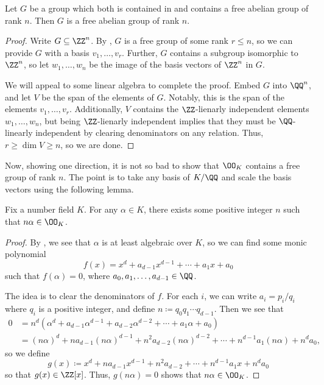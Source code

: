 \documentclass[../notes.tex]{subfiles}
\begin{document}
\begin{corollary} \label{cor:get-free-rank-n}
	Let $G$ be a group which both is contained in and contains a free abelian group of rank $n$. Then $G$ is a free abelian group of rank $n$.
\end{corollary}
\begin{proof}
	Write $G\subseteq\ZZ^n$. By , $G$ is a free group of some rank $r\le n$, so we can provide $G$ with a basis $v_1,\ldots,v_r$. Further, $G$ contains a subgroup isomorphic to $\ZZ^n$, so let $w_1,\ldots,w_n$ be the image of the basis vectors of $\ZZ^n$ in $G$.

	We will appeal to some linear algebra to complete the proof. Embed $G$ into $\QQ^n$, and let $V$ be the span of the elements of $G$. Notably, this is the span of the elements $v_1,\ldots,v_r$. Additionally, $V$ contains the $\ZZ$-lienarly independent elements $w_1,\ldots,w_n$, but being $\ZZ$-lienarly independent implies that they must be $\QQ$-linearly independent by clearing denominators on any relation. Thus, $r\ge\dim V\ge n$, so we are done.
\end{proof}
Now, showing one direction, it is not so bad to show that $\OO_K$ contains a free group of rank $n$. The point is to take any basis of $K/\QQ$ and scale the basis vectors using the following lemma.
\begin{lemma} \label{lem:clear-fraction-alg-int}
	Fix a number field $K$. For any $\alpha\in K$, there exists some positive integer $n$ such that $n\alpha\in\OO_K$.
\end{lemma}
\begin{proof}
	By , we see that $\alpha$ is at least algebraic over $K$, so we can find some monic polynomial
	\[f(x)=x^d+a_{d-1}x^{d-1}+\cdots+a_1x+a_0\]
	such that $f(\alpha)=0$, where $a_0,a_1,\ldots,a_{d-1}\in\QQ$.
	
	The idea is to clear the denominators of $f$. For each $i$, we can write $a_i=p_i/q_i$ where $q_i$ is a positive integer, and define $n\coloneqq  q_0q_1\cdots q_{d-1}$. Then we see that
	\begin{align*}
		0 &= n^d\left(\alpha^d+a_{d-1}\alpha^{d-1}+a_{d-2}\alpha^{d-2}+\cdots+a_1\alpha+a_0\right) \\
		&= (n\alpha)^d+na_{d-1}(n\alpha)^{d-1}+n^2a_{d-2}(n\alpha)^{d-2}+\cdots+n^{d-1}a_1(n\alpha)+n^da_0,
	\end{align*}
	so we define
	\[g(x)\coloneqq x^d+na_{d-1}x^{d-1}+n^2a_{d-2}+\cdots+n^{d-1}a_1x+n^da_0\]
	so that $g(x)\in\ZZ[x]$. Thus, $g(n\alpha)=0$ shows that $n\alpha\in\OO_K$.
\end{proof}
\end{document}
